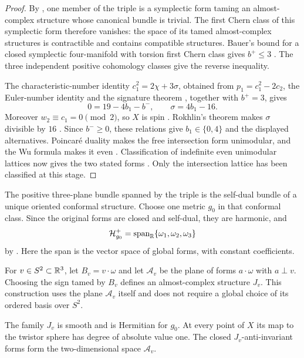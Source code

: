 \begin{proof}
By , one member of the triple is a symplectic
form taming an almost-complex structure whose canonical bundle is
trivial. The first Chern class of this symplectic form therefore
vanishes: the space of its tamed almost-complex structures is
contractible and contains compatible structures. Bauer's bound for a
closed symplectic four-manifold with torsion first Chern class gives
$b^+\le3$ \cite[Corollary~1.2]{Bauer2008}. The three independent
positive cohomology classes give the reverse inequality.

The characteristic-number identity $c_1^2=2\chi+3\sigma$, obtained
from $p_1=c_1^2-2c_2$, the Euler-number identity and the signature
theorem \cite[Corollaries~11.12 and~15.5, Theorem~19.4]{MilnorStasheff1974},
together with $b^+=3$, gives
\[
 0=19-4b_1-b^-,\qquad \sigma=4b_1-16.
\]
Moreover $w_2\equiv c_1=0\pmod2$, so $X$ is spin
\cite[Problem~14-B]{MilnorStasheff1974}. Rokhlin's theorem makes
$\sigma$ divisible by $16$ \cite{Rokhlin1952}.
Since $b^-\ge0$, these relations give
$b_1\in\{0,4\}$ and the displayed alternatives. Poincar\'e duality
makes the free intersection form unimodular, and the Wu formula makes
it even \cite[Theorem~11.14]{MilnorStasheff1974}. Classification of
indefinite even unimodular lattices now gives the two stated forms
\cite[Chapter~V, Section~2.2, Theorems~5--6]{Serre1973}.
Only the intersection lattice has been classified at this stage.
\end{proof}

The positive three-plane bundle spanned by the triple is the
self-dual bundle of a unique oriented conformal structure. Choose one
metric $g_0$ in that conformal class. Since the original forms are
closed and self-dual, they are harmonic, and
\begin{equation}\label{eq:pair-harmonic-basis}
 \mathcal H^+_{g_0}
 =\operatorname{span}_{\mathbb R}\{\omega_1,\omega_2,\omega_3\}
\end{equation}
by . Here the span is the vector space of global
forms, with constant coefficients.

For $v\in S^2\subset\mathbb R^3$, let $B_v=v\cdot\omega$ and let
$\mathcal A_v$ be the plane of forms $a\cdot\omega$ with $a\perp v$.
Choosing the sign tamed by $B_v$ defines an almost-complex structure
$J_v$. This construction uses the plane $\mathcal A_v$ itself and does
not require a global choice of its ordered basis over $S^2$.

\begin{lemma}\label{lem:twistor-degree}
The family $J_v$ is smooth and is Hermitian for $g_0$. At every point
of $X$ its map to the twistor sphere has degree of absolute value one.
The closed $J_v$-anti-invariant forms form the two-dimensional space
$\mathcal A_v$.
\end{lemma}

